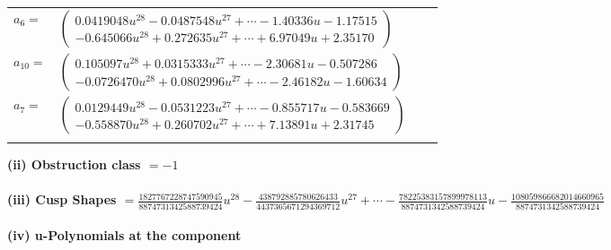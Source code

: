\documentclass[1p]{elsarticle_modified}
\theoremstyle{definition}
\begin{document}
\begin{tabular}{m{7pt} m{180pt} m{7pt} m{180pt} }
\flushright $a_{6}=$&$\begin{pmatrix}0.0419048 u^{28}-0.0487548 u^{27}+\cdots-1.40336 u-1.17515\\-0.645066 u^{28}+0.272635 u^{27}+\cdots+6.97049 u+2.35170\end{pmatrix}$ \\
\flushright $a_{10}=$&$\begin{pmatrix}0.105097 u^{28}+0.0315333 u^{27}+\cdots-2.30681 u-0.507286\\-0.0726470 u^{28}+0.0802996 u^{27}+\cdots-2.46182 u-1.60634\end{pmatrix}$ \\
\flushright $a_{7}=$&$\begin{pmatrix}0.0129449 u^{28}-0.0531223 u^{27}+\cdots-0.855717 u-0.583669\\-0.558870 u^{28}+0.260702 u^{27}+\cdots+7.13891 u+2.31745\end{pmatrix}$\\&\end{tabular}
\flushleft \textbf{(ii) Obstruction class $= -1$}\\~\\
\flushleft \textbf{(iii) Cusp Shapes $= \frac{1827767228747590945}{8874731342588739424} u^{28}-\frac{438792885780626433}{4437365671294369712} u^{27}+\cdots-\frac{78225383157899978113}{8874731342588739424} u-\frac{108059866682014660965}{8874731342588739424}$}\\~\\
\newpage\renewcommand{\arraystretch}{1}
\flushleft \textbf{(iv) u-Polynomials at the component}\newline \\
\end{document}
